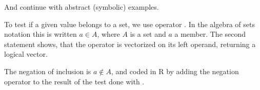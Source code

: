 \documentclass[krantz2]{krantz}\usepackage{knitr}%
\begin{document}
And continue with abstract (symbolic) examples.

\begin{knitrout}\footnotesize
{}\color{fgcolor}\begin{kframe}
\begin{alltt}
 \hlkwb{<-} \hlstd{(}\hlstd{,} \hlstd{,} \hlstd{,} \hlstd{)}
\end{alltt}
\end{kframe}
\end{knitrout}

To test if a given value belongs to a set, we use operator . In the algebra of sets notation this is written $a \in A$, where $A$ is a set and $a$ a member. The second statement shows, that the  operator is vectorized on its left operand, returning a logical vector.

\begin{knitrout}\footnotesize
{}\color{fgcolor}
\end{knitrout}

The negation of inclusion is $a \not\in A$, and coded in R by adding the negation operator \Roperator{!} to the result of the test done with .

\begin{knitrout}\footnotesize
{}\color{fgcolor}
\end{knitrout}
\end{document}
